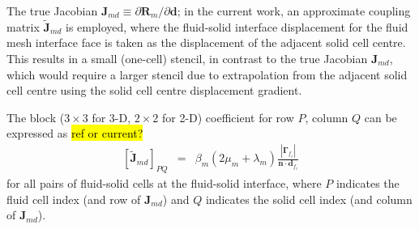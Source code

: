 \documentclass[sn-mathphys,Numbered]{sn-jnl}%
\newcommand{\bb}{\boldsymbol}
\begin{document}
The true Jacobian $\bb{J}_{md} \equiv \partial \bb{R}_{m}/\partial \bb{d}$; in the current work, an approximate coupling matrix $\tilde{\bb{J}}_{md}$ is employed, where the fluid-solid interface displacement for the fluid mesh interface face is taken as the displacement of the adjacent solid cell centre.
This results in a small (one-cell) stencil, in contrast to the true Jacobian $\bb{J}_{md}$, which would require a larger stencil due to extrapolation from the adjacent solid cell centre using the solid cell centre displacement gradient.

The block ($3\times3$ for 3-D, $2\times2$ for 2-D) coefficient for row $P$, column $Q$ can be expressed as \hl{ref or current?}
\begin{eqnarray}
	 \left[ \tilde{\bb{J}}_{md} \right]_{PQ} &=&
		\beta_m (2\mu_m + \lambda_m)  \frac{ \left| \bb{\Gamma}_{f_i} \right| }{\bb{n} \cdot \bb{d}_{f_i}}
\end{eqnarray}
for all pairs of fluid-solid cells at the fluid-solid interface, where $P$ indicates the fluid cell index (and row of $\bb{J}_{md}$) and $Q$ indicates the solid cell index (and column of $\bb{J}_{md}$).





\end{document}
